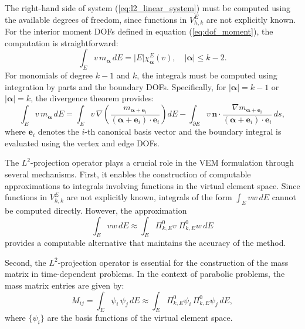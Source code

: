 \documentclass{article}
\begin{document}
The right-hand side of system (\ref{eq:l2_linear_system}) must be computed using the available degrees of freedom, since functions in $V_{h,k}^E$ are not explicitly known. For the interior moment DOFs defined in equation (\ref{eq:dof_moment}), the computation is straightforward:
\begin{equation}\label{eq:l2_interior_moments}
    \int_E v\, m_{\boldsymbol{\alpha}} \, dE = |E| \chi^E_{\boldsymbol{\alpha}}(v), \quad |\boldsymbol{\alpha}| \leq k-2.
\end{equation}
For monomials of degree $k-1$ and $k$, the integrals must be computed using integration by parts and the boundary DOFs. Specifically, for $|\boldsymbol{\alpha}| = k-1$ or $|\boldsymbol{\alpha}| = k$, the divergence theorem provides:
\begin{equation}\label{eq:l2_boundary_contribution}
    \int_E v\, m_{\boldsymbol{\alpha}} \, dE = \int_E v\, \nabla \left( \frac{m_{\boldsymbol{\alpha}+\mathbf{e}_i}}{(\boldsymbol{\alpha}+\mathbf{e}_i) \cdot \mathbf{e}_i} \right) dE - \int_{\partial E} v\, \mathbf{n} \cdot \frac{\nabla m_{\boldsymbol{\alpha}+\mathbf{e}_i}}{(\boldsymbol{\alpha}+\mathbf{e}_i) \cdot \mathbf{e}_i} \, ds,
\end{equation}
where $\mathbf{e}_i$ denotes the $i$-th canonical basis vector and the boundary integral is evaluated using the vertex and edge DOFs.

The $L^2$-projection operator plays a crucial role in the VEM formulation through several mechanisms. First, it enables the construction of computable approximations to integrals involving functions in the virtual element space. Since functions in $V_{h,k}^E$ are not explicitly known, integrals of the form $\int_E v w \, dE$ cannot be computed directly. However, the approximation
\begin{equation}\label{eq:l2_integral_approximation}
    \int_E v w \, dE \approx \int_E \Pi^0_{k,E} v \; \Pi^0_{k,E} w \, dE
\end{equation}
provides a computable alternative that maintains the accuracy of the method.

Second, the $L^2$-projection operator is essential for the construction of the mass matrix in time-dependent problems. In the context of parabolic problems, the mass matrix entries are given by:
\begin{equation}\label{eq:mass_matrix_entries}
    M_{ij} = \int_E \psi_i \, \psi_j \, dE \approx \int_E \Pi^0_{k,E} \psi_i \, \Pi^0_{k,E} \psi_j \, dE,
\end{equation}
where $\{\psi_i\}$ are the basis functions of the virtual element space.
\end{document}
